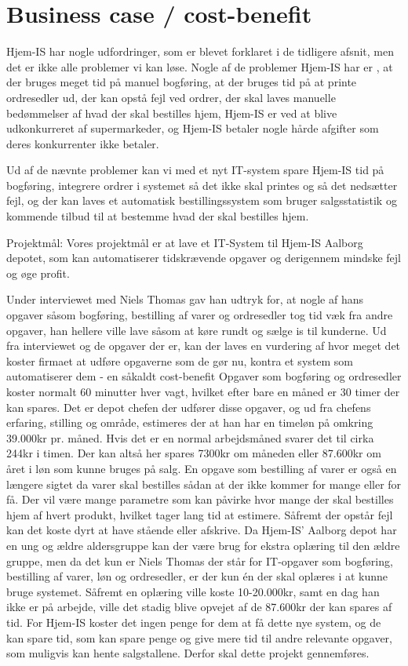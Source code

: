 \section{Business case / cost-benefit}\label{businesscase}
Hjem-IS har nogle udfordringer, som er blevet forklaret i de tidligere afsnit, men det er ikke alle problemer vi kan løse. Nogle af de problemer Hjem-IS har er , at der bruges meget tid på manuel bogføring, at der bruges tid på at printe ordresedler ud, der kan opstå fejl ved ordrer, der skal laves manuelle bedømmelser af hvad der skal bestilles hjem, Hjem-IS er ved at blive udkonkurreret af supermarkeder, og Hjem-IS betaler nogle hårde afgifter som deres konkurrenter ikke betaler.

Ud af de nævnte problemer kan vi med et nyt IT-system spare Hjem-IS tid på bogføring, integrere ordrer i systemet så det ikke skal printes og så det nedsætter fejl, og der kan laves et automatisk bestillingssystem som bruger salgsstatistik og kommende tilbud til at bestemme hvad der skal bestilles hjem. 

Projektmål:
Vores projektmål er at lave et IT-System til Hjem-IS Aalborg depotet, som kan automatiserer tidskrævende opgaver og derigennem mindske fejl og øge profit.

Under interviewet med Niels Thomas gav han udtryk for, at nogle af hans opgaver såsom bogføring, bestilling af varer og ordresedler tog tid væk fra andre opgaver, han hellere ville lave såsom at køre rundt og sælge is til kunderne. 
Ud fra interviewet og de opgaver der er, kan der laves en vurdering af hvor meget det koster firmaet at udføre opgaverne som de gør nu, kontra et system som automatiserer dem - en såkaldt cost-benefit \cite{Costbenefit}
Opgaver som bogføring og ordresedler koster normalt 60 minutter hver vagt, hvilket efter bare en måned er 30 timer der kan spares. Det er depot chefen der udfører disse opgaver, og ud fra chefens erfaring, stilling og område, estimeres der at han har en timeløn på omkring 39.000kr pr. måned\cite{Lagerchef}. Hvis det er en normal arbejdsmåned svarer det til cirka 244kr i timen. Der kan altså her spares 7300kr om måneden eller 87.600kr om året i løn som kunne bruges på salg. 
En opgave som bestilling af varer er også en længere sigtet da varer skal bestilles sådan at der ikke kommer for mange eller for få. Der vil være mange parametre som kan påvirke hvor mange der skal bestilles hjem af hvert produkt, hvilket tager lang tid at estimere. Såfremt der opstår fejl kan det koste dyrt at have stående eller afskrive. 
Da Hjem-IS’ Aalborg depot har en ung og ældre aldersgruppe kan der være brug for ekstra oplæring til den ældre gruppe, men da det kun er Niels Thomas der står for IT-opgaver som bogføring, bestilling af varer, løn og ordresedler, er der kun én der skal oplæres i at kunne bruge systemet. Såfremt en oplæring ville koste 10-20.000kr, samt en dag han ikke er på arbejde, ville det stadig blive opvejet af de 87.600kr der kan spares af tid.
For Hjem-IS koster det ingen penge for dem at få dette nye system, og de kan spare tid, som kan spare penge og give mere tid til andre relevante opgaver, som muligvis kan hente salgstallene. Derfor skal dette projekt gennemføres.

